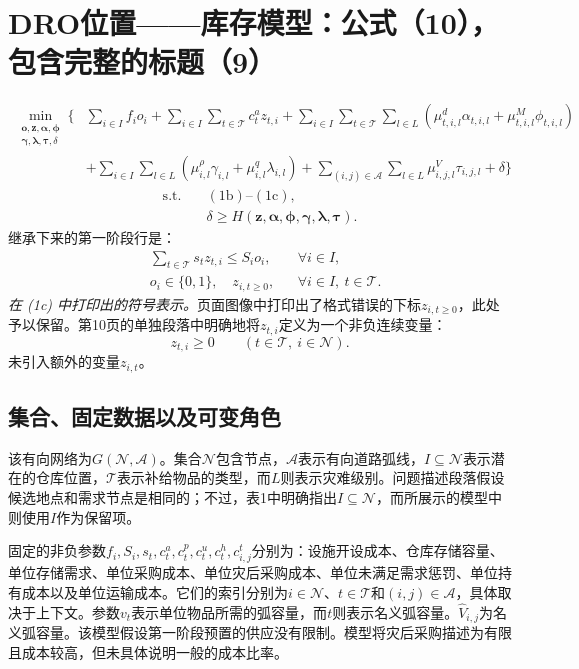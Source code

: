 \documentclass{article}
\begin{document}
\section*{DRO位置——库存模型：公式（10），包含完整的标题（9）}
\begin{equation}
\begin{aligned}
\min_{\substack{\boldsymbol{o},\boldsymbol{z},\boldsymbol{\alpha},\boldsymbol{\phi}\\
\boldsymbol{\gamma},\boldsymbol{\lambda},\boldsymbol{\tau},\delta}}
\Biggl\{&\sum_{i\in I}f_i o_i+
\sum_{i\in I}\sum_{t\in\mathcal T}c_t^a z_{t,i}
+\sum_{i\in I}\sum_{t\in\mathcal T}\sum_{l\in L}
 \left(\mu^d_{t,i,l}\alpha_{t,i,l}+\mu^M_{t,i,l}\phi_{t,i,l}\right)\\
&+\sum_{i\in I}\sum_{l\in L}
 \left(\mu^\rho_{i,l}\gamma_{i,l}+\mu^q_{i,l}\lambda_{i,l}\right)
+\sum_{(i,j)\in\mathcal A}\sum_{l\in L}\mu^V_{i,j,l}\tau_{i,j,l}+\delta\Biggr\}
\end{aligned}\tag{10a}
\end{equation}
\begin{align}
\text{s.t.}\quad &(1\mathrm b)\text{--}(1\mathrm c),\tag{10b}\\
&\delta\geq H(\boldsymbol z,\boldsymbol\alpha,\boldsymbol\phi,
\boldsymbol\gamma,\boldsymbol\lambda,\boldsymbol\tau).\tag{10c}
\end{align}
继承下来的第一阶段行是：
\begin{align}
&\sum_{t\in\mathcal T}s_t z_{t,i}\leq S_i o_i,
&&\forall i\in I,\tag{1b}\\
&o_i\in\{0,1\},\quad z_{i,t\geq0},
&&\forall i\in I,\ t\in\mathcal T.\tag{1c}
\end{align}
\noindent\emph{在 (1c) 中打印出的符号表示。}页面图像中打印出了格式错误的下标$z_{i,t\geq0}$，此处予以保留。第10页的单独段落中明确地将$z_{t,i}$定义为一个非负连续变量：
\[
z_{t,i}\geq0\qquad(t\in\mathcal T,\ i\in\mathcal N).
\]
未引入额外的变量$z_{i,t}$。

\subsection*{集合、固定数据以及可变角色}
该有向网络为$G(\mathcal N,\mathcal A)$。集合$\mathcal N$包含节点，$\mathcal A$表示有向道路弧线，$I\subseteq\mathcal N$表示潜在的仓库位置，$\mathcal T$表示补给物品的类型，而$L$则表示灾难级别。问题描述段落假设候选地点和需求节点是相同的；不过，表1中明确指出$I\subseteq\mathcal N$，而所展示的模型中则使用$I$作为保留项。

固定的非负参数$f_i,S_i,s_t,c_t^a,c_t^p,c_t^u,c_t^h,c^t_{i,j}$分别为：设施开设成本、仓库存储容量、单位存储需求、单位采购成本、单位灾后采购成本、单位未满足需求惩罚、单位持有成本以及单位运输成本。它们的索引分别为$i\in\mathcal N$、$t\in\mathcal T$和$(i,j)\in\mathcal A$，具体取决于上下文。参数$v_t$表示单位物品所需的弧容量，而$t$则表示名义弧容量。$\hat V_{i,j}$为名义弧容量。该模型假设第一阶段预置的供应没有限制。模型将灾后采购描述为有限且成本较高，但未具体说明一般的成本比率。
\end{document}

